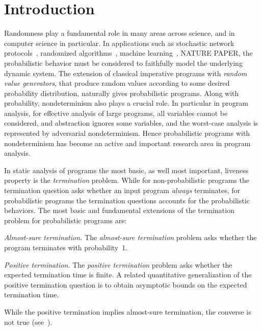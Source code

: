 

\section{Introduction}\label{sec:introduction}


Randomness play a fundamental role in many areas across science, and in 
computer science in particular.
In applications such as stochastic network protocols~\cite{BaierBook,prism},
randomized algorithms~\cite{RandBook,RandBook2}, machine learning~\cite{},
NATURE PAPER, the probabilistic behavior must be considered to faithfully model
the underlying dynamic system.
The extension of classical imperative programs with \emph{random value generators}, 
that produce random values according to some desired probability distribution, 
naturally gives probabilistic programs.
Along with probability, nondeterminism also plays a crucial role.
In particular in program analysis, for effective analysis of large programs,
all variables cannot be considered, and abstraction ignores some variables,
and the worst-case analysis is represented by adversarial nondeterminism.
Hence probabilistic programs with nondeterminism has become an active and 
important research area in program analysis. 
 


\smallskip{} 
In static analysis of programs the most basic, as well most important, 
liveness property is the {\em termination} problem.
While for non-probabilistic programs the termination question asks whether
an input program {\em always} terminates, for probabilistic programs 
the termination questions accounts for the probabilistic behaviors. 
The most basic and fundamental extensions of the termination problem 
for probabilistic programs are:

\begin{compactenum}
\item \emph{Almost-sure termination.} 
The \emph{almost-sure termination} problem asks whether the program terminates with probability~1.


\item \emph{Positive termination.} 
The \emph{positive termination} problem asks whether the expected termination time is finite.
A related quantitative generalization of the positive termination question is to obtain 
asymptotic bounds on the expected termination time.

\end{compactenum}
While the positive termination implies almost-sure termination, the converse is not true (see~\cite[]{}).




